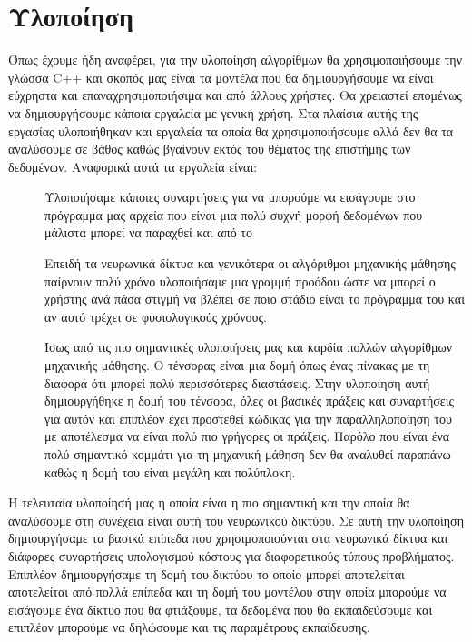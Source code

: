 \newpage
\section{Υλοποίηση}
Όπως έχουμε ήδη αναφέρει, για την υλοποίηση αλγορίθμων θα χρησιμοποιήσουμε την γλώσσα \textlatin{C++} και σκοπός μας είναι τα μοντέλα που θα δημιουργήσουμε να είναι εύχρηστα και επαναχρησιμοποιήσιμα και από
άλλους χρήστες. Θα χρειαστεί επομένως να δημιουργήσουμε κάποια εργαλεία με γενική χρήση. Στα πλαίσια αυτής της εργασίας υλοποιήθηκαν και εργαλεία τα οποία θα χρησιμοποιήσουμε αλλά δεν θα τα αναλύσουμε σε βάθος καθώς βγαίνουν εκτός του
θέματος της επιστήμης των δεδομένων. Αναφορικά αυτά τα εργαλεία είναι:
\begin{description}
    \item[] Υλοποιήσαμε κάποιες συναρτήσεις για να μπορούμε να εισάγουμε στο πρόγραμμα μας αρχεία  που είναι μια πολύ συχνή μορφή δεδομένων που μάλιστα μπορεί να παραχθεί και από το 
    \item[] Επειδή τα νευρωνικά δίκτυα και γενικότερα οι αλγόριθμοι μηχανικής μάθησης παίρνουν πολύ χρόνο υλοποιήσαμε μια γραμμή προόδου ώστε να μπορεί ο χρήστης ανά πάσα στιγμή να βλέπει σε ποιο στάδιο είναι το πρόγραμμα
    του και αν αυτό τρέχει σε φυσιολογικούς χρόνους.
    \item[] Ίσως από τις πιο σημαντικές υλοποιήσεις μας και καρδία πολλών αλγορίθμων μηχανικής μάθησης. Ο τένσορας είναι μια δομή όπως ένας πίνακας με τη διαφορά ότι μπορεί πολύ περισσότερες διαστάσεις. Στην υλοποίηση αυτή δημιουργήθηκε η δομή του τένσορα, όλες οι βασικές πράξεις και συναρτήσεις για αυτόν και επιπλέον έχει προστεθεί κώδικας για την παραλληλοποίηση του με αποτέλεσμα να είναι πολύ πιο γρήγορες οι πράξεις. Παρόλο που είναι ένα πολύ
    σημαντικό κομμάτι για τη μηχανική μάθηση δεν θα αναλυθεί παραπάνω καθώς η δομή του είναι μεγάλη και πολύπλοκη.
\end{description}

Η τελευταία υλοποίησή μας η οποία είναι η πιο σημαντική και την οποία θα αναλύσουμε στη συνέχεια είναι αυτή του νευρωνικού δικτύου. Σε αυτή την υλοποίηση δημιουργήσαμε τα βασικά επίπεδα που χρησιμοποιούνται στα νευρωνικά δίκτυα και διάφορες
συναρτήσεις υπολογισμού κόστους για διαφορετικούς τύπους προβλήματος. Επιπλέον δημιουργήσαμε τη δομή του δικτύου το οποίο μπορεί αποτελείται αποτελείται από πολλά επίπεδα και τη δομή του μοντέλου στην οποία μπορούμε να εισάγουμε ένα δίκτυο που θα φτιάξουμε, τα δεδομένα που θα εκπαιδεύσουμε και επιπλέον μπορούμε να δηλώσουμε και τις παραμέτρους εκπαίδευσης.
